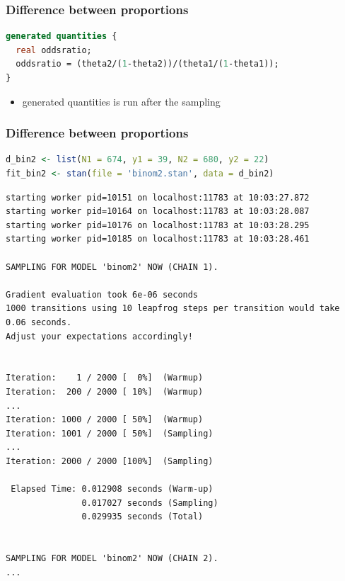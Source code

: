 \documentclass[10pt,handout]{beamer}
\begin{document}
\begin{frame}[fragile]

\frametitle{Difference between proportions}


  {\small
\begin{lstlisting}[language=Stan]
generated quantities {
  real oddsratio;
  oddsratio = (theta2/(1-theta2))/(theta1/(1-theta1));
}
\end{lstlisting}
    }

    \begin{itemize}
    \item generated quantities is run after the sampling
    \end{itemize}

\end{frame}

\begin{frame}[fragile]

\frametitle{Difference between proportions}

  {\small
\begin{lstlisting}[language=R]
d_bin2 <- list(N1 = 674, y1 = 39, N2 = 680, y2 = 22)
fit_bin2 <- stan(file = 'binom2.stan', data = d_bin2)
\end{lstlisting}
  }

  {\tiny
\begin{lstlisting}
starting worker pid=10151 on localhost:11783 at 10:03:27.872
starting worker pid=10164 on localhost:11783 at 10:03:28.087
starting worker pid=10176 on localhost:11783 at 10:03:28.295
starting worker pid=10185 on localhost:11783 at 10:03:28.461

SAMPLING FOR MODEL 'binom2' NOW (CHAIN 1).

Gradient evaluation took 6e-06 seconds
1000 transitions using 10 leapfrog steps per transition would take 0.06 seconds.
Adjust your expectations accordingly!


Iteration:    1 / 2000 [  0%]  (Warmup)
Iteration:  200 / 2000 [ 10%]  (Warmup)
...
Iteration: 1000 / 2000 [ 50%]  (Warmup)
Iteration: 1001 / 2000 [ 50%]  (Sampling)
...
Iteration: 2000 / 2000 [100%]  (Sampling)

 Elapsed Time: 0.012908 seconds (Warm-up)
               0.017027 seconds (Sampling)
               0.029935 seconds (Total)


SAMPLING FOR MODEL 'binom2' NOW (CHAIN 2).
...
\end{lstlisting}
  }

\end{frame}
\end{document}
